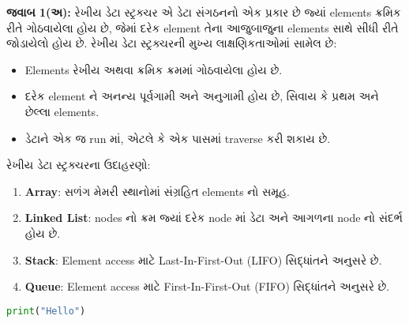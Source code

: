 \documentclass[12pt]{article}
\providecommand{\tightlist}{%
  \setlength{\itemsep}{0pt}\setlength{\parskip}{0pt}}
\begin{document}
{\textbf{જવાબ 1(અ):} રેખીય ડેટા સ્ટ્રક્ચર એ ડેટા સંગઠનનો એક પ્રકાર છે જ્યાં elements
ક્રમિક રીતે ગોઠવાયેલા હોય છે, જેમાં દરેક element તેના આજુબાજુના elements સાથે સીધી
રીતે જોડાયેલો હોય છે. રેખીય ડેટા સ્ટ્રક્ચરની મુખ્ય લાક્ષણિકતાઓમાં સામેલ છે:

\begin{itemize}
\tightlist
\item
  Elements રેખીય અથવા ક્રમિક ક્રમમાં ગોઠવાયેલા હોય છે.
\item
  દરેક element ને અનન્ય પૂર્વગામી અને અનુગામી હોય છે, સિવાય કે પ્રથમ અને છેલ્લા
  elements.
\item
  ડેટાને એક જ run માં, એટલે કે એક પાસમાં traverse કરી શકાય છે.
\end{itemize}

રેખીય ડેટા સ્ટ્રક્ચરના ઉદાહરણો:

\begin{enumerate}
\def\labelenumi{\arabic{enumi}.}
\tightlist
\item
  \textbf{Array}: સળંગ મેમરી સ્થાનોમાં સંગ્રહિત elements નો સમૂહ.
\item
  \textbf{Linked List}: nodes નો ક્રમ જ્યાં દરેક node માં ડેટા અને આગળના node
  નો સંદર્ભ હોય છે.
\item
  \textbf{Stack}: Element access માટે Last-In-First-Out (LIFO) સિદ્ધાંતને
  અનુસરે છે.
\item
  \textbf{Queue}: Element access માટે First-In-First-Out (FIFO) સિદ્ધાંતને
  અનુસરે છે.
\end{enumerate}

\begin{lstlisting}[language=Python]
print("Hello")
\end{lstlisting}

\subsubsection{}\label{section}}
\end{document}
